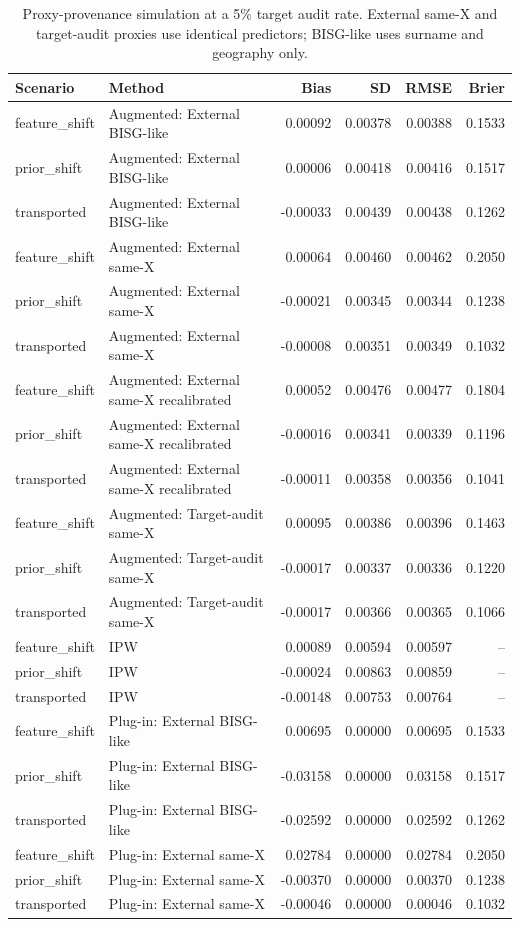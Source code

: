 \begin{table}[t]
\centering\small
\caption{Proxy-provenance simulation at a 5\% target audit rate. External same-X and target-audit proxies use identical predictors; BISG-like uses surname and geography only.}
\label{tab:sameX-proxy-provenance}
\begin{tabular}{llrrrr}
\toprule
Scenario & Method & Bias & SD & RMSE & Brier \\
\midrule
feature_shift & Augmented: External BISG-like & 0.00092 & 0.00378 & 0.00388 & 0.1533 \\
prior_shift & Augmented: External BISG-like & 0.00006 & 0.00418 & 0.00416 & 0.1517 \\
transported & Augmented: External BISG-like & -0.00033 & 0.00439 & 0.00438 & 0.1262 \\
feature_shift & Augmented: External same-X & 0.00064 & 0.00460 & 0.00462 & 0.2050 \\
prior_shift & Augmented: External same-X & -0.00021 & 0.00345 & 0.00344 & 0.1238 \\
transported & Augmented: External same-X & -0.00008 & 0.00351 & 0.00349 & 0.1032 \\
feature_shift & Augmented: External same-X recalibrated & 0.00052 & 0.00476 & 0.00477 & 0.1804 \\
prior_shift & Augmented: External same-X recalibrated & -0.00016 & 0.00341 & 0.00339 & 0.1196 \\
transported & Augmented: External same-X recalibrated & -0.00011 & 0.00358 & 0.00356 & 0.1041 \\
feature_shift & Augmented: Target-audit same-X & 0.00095 & 0.00386 & 0.00396 & 0.1463 \\
prior_shift & Augmented: Target-audit same-X & -0.00017 & 0.00337 & 0.00336 & 0.1220 \\
transported & Augmented: Target-audit same-X & -0.00017 & 0.00366 & 0.00365 & 0.1066 \\
feature_shift & IPW & 0.00089 & 0.00594 & 0.00597 & -- \\
prior_shift & IPW & -0.00024 & 0.00863 & 0.00859 & -- \\
transported & IPW & -0.00148 & 0.00753 & 0.00764 & -- \\
feature_shift & Plug-in: External BISG-like & 0.00695 & 0.00000 & 0.00695 & 0.1533 \\
prior_shift & Plug-in: External BISG-like & -0.03158 & 0.00000 & 0.03158 & 0.1517 \\
transported & Plug-in: External BISG-like & -0.02592 & 0.00000 & 0.02592 & 0.1262 \\
feature_shift & Plug-in: External same-X & 0.02784 & 0.00000 & 0.02784 & 0.2050 \\
prior_shift & Plug-in: External same-X & -0.00370 & 0.00000 & 0.00370 & 0.1238 \\
transported & Plug-in: External same-X & -0.00046 & 0.00000 & 0.00046 & 0.1032 \\
\bottomrule
\end{tabular}
\end{table}
